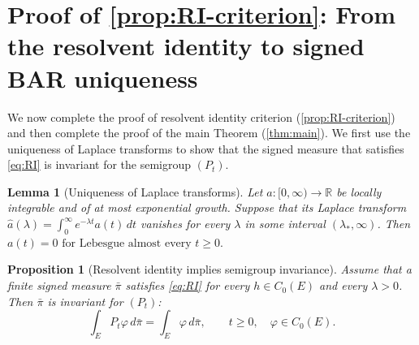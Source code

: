 \documentclass[aihp]{imsart}
\numberwithin{equation}{section}
\theoremstyle{plain}
\newtheorem{proposition}[proposition]{Proposition}
\newtheorem{lemma}[lemma]{Lemma}
\theoremstyle{definition}
\newcommand{\1}{\mathbf 1}
\begin{document}
\section{Proof of \cref{prop:RI-criterion}: From the resolvent identity to signed BAR uniqueness}\label{sec:completion}

We now complete the proof of resolvent identity criterion (\cref{prop:RI-criterion}) and then complete the proof of the main Theorem (\cref{thm:main}). We first use the uniqueness of Laplace transforms to show that the signed measure that satisfies \eqref{eq:RI} is invariant for the semigroup \((P_t)\).

\begin{lemma}[Uniqueness of Laplace transforms{\normalfont\cite[Chapter~II]{Doetsch1974}}]\label{lem:laplace-uniqueness}
Let \(a:[0,\infty)\to\mathbb R\) be locally integrable and of at most exponential
growth. Suppose that its Laplace transform
\(
        \widehat a(\lambda)
        =
        \int_0^\infty e^{-\lambda t}a(t)\,dt
\)
vanishes for every \(\lambda\) in some interval \((\lambda_\ast,\infty)\). Then
\(a(t)=0\text{ for Lebesgue almost every }t\ge0 .\)
\end{lemma}



\begin{proposition}[Resolvent identity implies semigroup invariance]\label{prop:semigroup-invariance}
Assume that a finite signed measure \(\bar\pi\) satisfies \eqref{eq:RI} for every
\(h\in C_0(E)\) and every \(\lambda>0\). Then \(\bar\pi\) is invariant for \((P_t)\):
\begin{equation}\label{eq:signed-invariance}
        \int_E P_t\varphi\,d\bar\pi
        =
        \int_E \varphi\,d\bar\pi,
        \qquad
        t\ge0,\quad \varphi\in C_0(E).
\end{equation}
\end{proposition}
\end{document}
